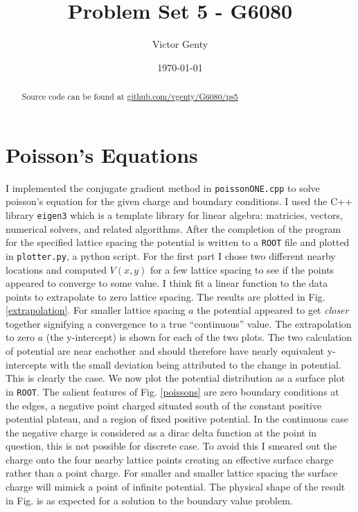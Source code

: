\documentclass[singlepage,notitlepage,nofootinbib,11pt]{revtex4-1}
\begin{document}
\title{Problem Set 5 - G6080}
\author{Victor Genty}
\date{\today}
\begin{abstract}
\centering
Source code can be found at \href{https://github.com/vgenty/G6080/tree/master/ps5}{github.com/vgenty/G6080/ps5}
\end{abstract}
\maketitle
\section{Poisson's Equations}
I implemented the conjugate gradient method in \texttt{poissonONE.cpp} to solve poisson's equation for the given charge and boundary conditions. I used the C++ library \texttt{eigen3} which is a template library for linear algebra: matricies, vectors, numerical solvers, and related algorithms. After the completion of the program for the specified lattice spacing the potential is written to a \texttt{ROOT} file and plotted in \texttt{plotter.py}, a python script. For the first part I chose two different nearby locations and computed $V(x,y)$ for a few lattice spacing to see if the points appeared to converge to some value. I think fit a linear function to the data points to extrapolate to zero lattice spacing. The results are plotted in Fig. \ref{extrapolation}. For smaller lattice spacing $a$ the potential appeared to get {\it closer} together signifying a convergence to a true ``continuous'' value. The extrapolation to zero $a$ (the y-intercept) is shown for each of the two plots.  The two calculation of potential are near eachother and should therefore have nearly equivalent y-intercepts with the small deviation being attributed to the change in potential. This is clearly the case. We now plot the potential distribution as a surface plot in \texttt{ROOT}. The salient features of Fig. \ref{poissons} are zero boundary conditions at the edges, a negative point charged situated south of the constant positive potential plateau, and a region of fixed positive potential. In the continuous case the negative charge is considered as a dirac delta function at the point in question, this is not possible for discrete case. To avoid this I smeared out the charge onto the four nearby lattice points creating an effective surface charge rather than a point charge. For smaller and smaller lattice spacing the surface charge will mimick a point of infinite potential. The physical shape of the result in Fig.  is as expected for a solution to the boundary value problem.
\end{document}
